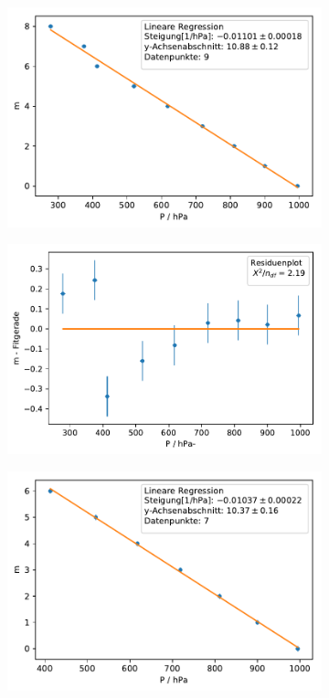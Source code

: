 \documentclass[12pt,a4paper]{article}
\begin{document}
\begin{figure}[H]
	\centering
	\begin{subfigure}{0.49\textwidth}
		\centering
		\includegraphics[width=\textwidth]{Python/MR5_LinReg_Rohdaten.pdf}
	\end{subfigure}
	\begin{subfigure}{0.49\textwidth}
		\centering
		\includegraphics[width=\textwidth]{Python/MR5_Residuen_Rohdaten.pdf}
	\end{subfigure}
	\begin{subfigure}{0.49\textwidth}
		\centering
		\includegraphics[width=\textwidth]{Python/MR5_LinReg.pdf}

\end{subfigure}
\end{figure}
\end{document}
